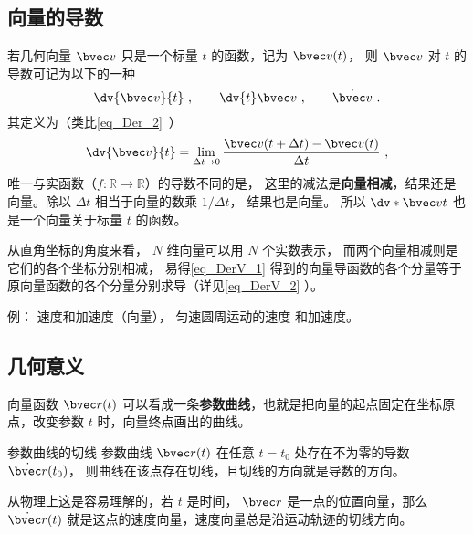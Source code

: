 
\begin{issues}
\end{issues}


\subsection{向量的导数}

若几何向量 $\bvec v$ 只是一个标量 $t$ 的函数，记为 $\bvec v(t)$， 则 $\bvec v$ 对 $t$ 的导数可记为以下的一种
\begin{equation}
\dv{\bvec v}{t}~, \qquad \dv{t}\bvec v~, \qquad \dot{\bvec v}~.
\end{equation}
其定义为（类比\autoref{eq_Der_2}~）
\begin{equation}\label{eq_DerV_1}
\dv{\bvec v}{t} = \lim_{\Delta t \to 0} \frac{\bvec v ( t + \Delta t) - \bvec v(t)}{\Delta t}~,
\end{equation}
唯一与实函数（$f:\mathbb R \to \mathbb R$）的导数不同的是， 这里的减法是\textbf{向量相减}，结果还是向量。除以 $\Delta t$ 相当于向量的数乘 $1/\Delta t$， 结果也是向量。 所以 $\dv*{\bvec v}{t}$ 也是一个向量关于标量 $t$ 的函数。

从直角坐标的角度来看， $N$ 维向量可以用 $N$ 个实数表示， 而两个向量相减则是它们的各个坐标分别相减， 易得\autoref{eq_DerV_1} 得到的向量导函数的各个分量等于原向量函数的各个分量分别求导（详见\autoref{eq_DerV_2} ）。

例： 速度和加速度（向量）， 匀速圆周运动的速度 和加速度。

\subsection{几何意义}
向量函数 $\bvec r(t)$ 可以看成一条\textbf{参数曲线}，也就是把向量的起点固定在坐标原点，改变参数 $t$ 时，向量终点画出的曲线。

\begin{theorem}{参数曲线的切线}
参数曲线 $\bvec r(t)$ 在任意 $t=t_0$ 处存在不为零的导数 $\dot{\bvec r}(t_0)$， 则曲线在该点存在切线，且切线的方向就是导数的方向。
\end{theorem}

从物理上这是容易理解的，若 $t$ 是时间， $\bvec r$ 是一点的位置向量，那么 $\dot{\bvec r}(t)$ 就是这点的速度向量，速度向量总是沿运动轨迹的切线方向。

